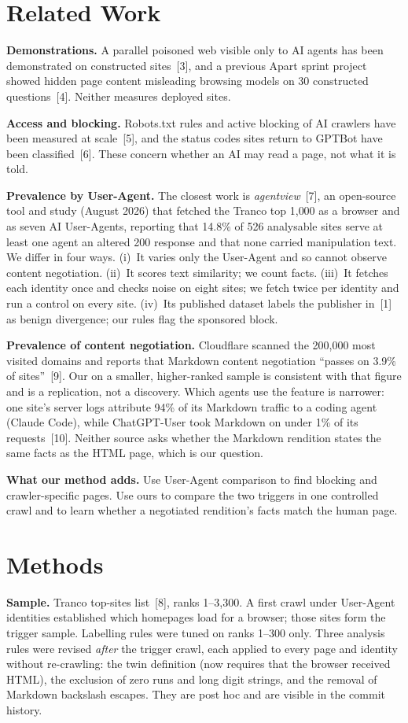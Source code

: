 \documentclass[10pt,a4paper]{article}
\begin{document}
\section{Related Work}
\textbf{Demonstrations.} A parallel poisoned web visible only to AI agents has been demonstrated on constructed sites~[3], and a previous Apart sprint project showed hidden page content misleading browsing models on 30 constructed questions~[4]. Neither measures deployed sites.

\textbf{Access and blocking.} Robots.txt rules and active blocking of AI crawlers have been measured at scale~[5], and the status codes sites return to GPTBot have been classified~[6]. These concern whether an AI may read a page, not what it is told.

\textbf{Prevalence by User-Agent.} The closest work is \emph{agentview}~[7], an open-source tool and study (August 2026) that fetched the Tranco top 1{,}000 as a browser and as seven AI User-Agents, reporting that 14.8\% of 526 analysable sites serve at least one agent an altered 200 response and that none carried manipulation text. We differ in four ways. (i)~It varies only the User-Agent and so cannot observe content negotiation. (ii)~It scores text similarity; we count facts. (iii)~It fetches each identity once and checks noise on eight sites; we fetch twice per identity and run a control on every site. (iv)~Its published dataset labels the publisher in~[1] as benign divergence; our rules flag the sponsored block.

\textbf{Prevalence of content negotiation.} Cloudflare scanned the 200{,}000 most visited domains and reports that Markdown content negotiation ``passes on 3.9\% of sites''~[9]. Our \AccTwinP{} on a smaller, higher-ranked sample is consistent with that figure and is a replication, not a discovery. Which agents use the feature is narrower: one site's server logs attribute 94\% of its Markdown traffic to a coding agent (Claude Code), while ChatGPT-User took Markdown on under 1\% of its requests~[10]. Neither source asks whether the Markdown rendition states the same facts as the HTML page, which is our question.

\textbf{What our method adds.} Use User-Agent comparison to find blocking and crawler-specific pages. Use ours to compare the two triggers in one controlled crawl and to learn whether a negotiated rendition's facts match the human page.

\section{Methods}
\textbf{Sample.} Tranco top-sites list~[8], ranks 1--3{,}300. A first crawl under User-Agent identities established which homepages load for a browser; those \TrigLoaded{} sites form the trigger sample. Labelling rules were tuned on ranks 1--300 only. Three analysis rules were revised \emph{after} the trigger crawl, each applied to every page and identity without re-crawling: the twin definition (now requires that the browser received HTML), the exclusion of zero runs and long digit strings, and the removal of Markdown backslash escapes. They are post hoc and are visible in the commit history.
\end{document}
